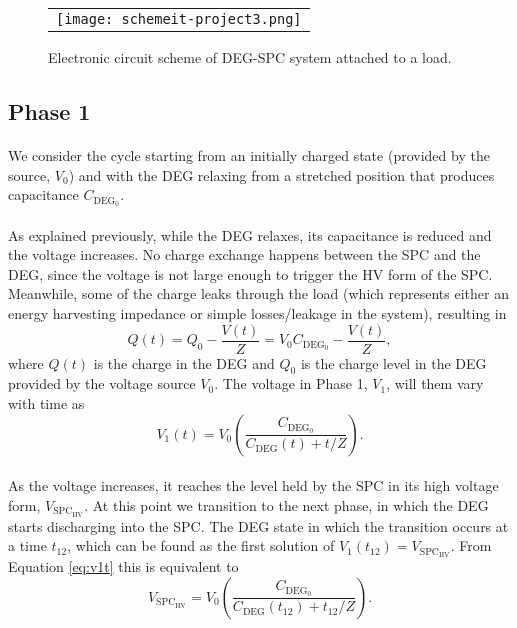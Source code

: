 \begin{figure}[ht]
\begin{center}
\begin{tabular}{c}
\texttt{[image: schemeit-project3.png]}\\
\end{tabular}
\end{center}
\caption 
{ \label{fig:circuit}
Electronic circuit scheme of DEG-SPC system attached to a load.} 
\end{figure}

\subsection{Phase 1}

\paragraph{}  We consider the cycle starting from an initially charged state (provided by the source, $V_0$) and with the DEG relaxing from a stretched position that produces capacitance $C_{\text{DEG}_0}$.

\paragraph{} As explained previously, while the DEG relaxes, its capacitance is reduced and the voltage increases. No charge exchange happens between the SPC and the DEG, since the voltage is not large enough to trigger the HV form of the SPC. Meanwhile, some of the charge leaks  through the load (which represents either an energy harvesting impedance or simple losses/leakage in the system), resulting in
\begin{equation}
Q(t) = Q_0-\frac{V(t)}{Z} = V_0C_{\text{DEG}_0}-\frac{V(t)}{Z},
\end{equation}
where $Q(t)$ is the charge in the DEG and $Q_0$ is the charge level in the DEG provided by the voltage source $V_0$.  The voltage in Phase 1, $V_1$, will them vary with time as
\begin{equation}\label{eq:v1t}
V_{1}(t) = V_0\left(\frac{C_{\text{DEG}_0}}{C_\text{DEG}(t)+t/Z}\right).
\end{equation}


\paragraph{} As the voltage increases, it reaches the level held by the SPC in its high voltage form, $V_{\text{SPC}_\text{HV}}$. At this point we transition to the next phase, in which the DEG starts discharging into the SPC. The DEG state in which the transition occurs at a time $t_{12}$, which can be found as the first solution of  $V_1(t_{12}) = V_{\text{SPC}_\text{HV}}$. From Equation \ref{eq:v1t} this is equivalent to
\begin{equation}
V_{\text{SPC}_\text{HV}} = V_0\left(\frac{C_{\text{DEG}_0}}{C_\text{DEG}(t_{12})+t_{12}/Z}\right).
\end{equation}


